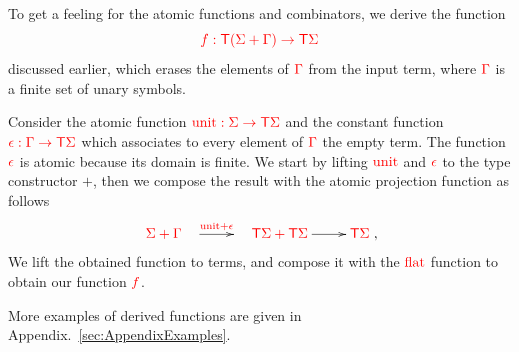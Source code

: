 

\noindent\begin{example}\label{ex:filter} 
 To get a feeling for the atomic functions and combinators, we derive the function
$$ {\color{red}{f:{\color{red}{\mathsf T}}({\color{red}{\Sigma}}+{\color{red}{\Gamma}})\to{\color{red}{\mathsf T}}{\color{red}{\Sigma}}}}$$
discussed earlier, which erases the elements of ${\color{red}{\Gamma}}$ from the input term, where ${\color{red}{\Gamma}}$ is a finite set of unary symbols. 

Consider the atomic function ${\color{red}{{\color{red}{\mathrm{unit}}}:{\color{red}{\Sigma}}\to{\color{red}{\mathsf T}}{\color{red}{\Sigma}}}}$ and the constant function ${\color{red}{\epsilon:{\color{red}{\Gamma}}\to{\color{red}{\mathsf T}}{\color{red}{\Sigma}}}}$ which associates to every element of ${\color{red}{\Gamma}}$ the empty term. The function ${\color{red}{\epsilon}}$ is atomic because its domain is finite. We start by lifting ${\color{red}{{\color{red}{\mathrm{unit}}}}}$ and ${\color{red}{\epsilon}}$ to the type constructor $+$, then we compose the result with the atomic projection function as follows
\begin{align*}
\xymatrix{
    \ranked{\rSigma+\rGamma}\quad \ar[r]^-{\ranked{\unit+\epsilon}} & \quad \ranked{\tmonad\rSigma+\tmonad\rSigma}\ar[r]^-{} &\tmonad\rSigma
},
\end{align*}
We lift the obtained function to terms, and compose it with the ${\color{red}{\mathrm{flat}}}$ function to obtain our function ${\color{red}{f}}$.  
\end{example}

More examples of derived functions are given in Appendix.~\ref{sec:AppendixExamples}.

